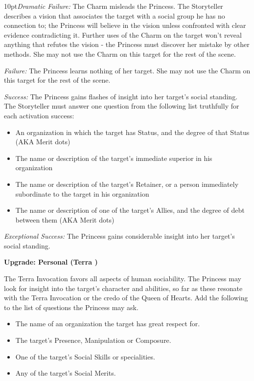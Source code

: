 \begin{myindentpar}{10pt}\emph{Dramatic Failure:} The Charm misleads the Princess. The Storyteller describes a vision that associates the target with a social group he has no connection to; the Princess will believe in the vision unless confronted with clear evidence contradicting it. Further uses of the Charm on the target won't reveal anything that refutes the vision - the Princess must discover her mistake by other methods. She may not use the Charm on this target for the rest of the scene.

\emph{Failure:} The Princess learns nothing of her target. She may not use the Charm on this target for the rest of the scene.

\emph{Success:} The Princess gains flashes of insight into her target's social standing. The Storyteller must answer one question from the following list truthfully for each activation success:

\begin{itemize}
\item An organization in which the target has Status, and the degree of that Status (AKA Merit dots)
\item The name or description of the target's immediate superior in his organization
\item The name or description of the target's Retainer, or a person immediately subordinate to the target in his organization
\item The name or description of one of the target's Allies, and the degree of debt between them (AKA Merit dots)
\end{itemize}


\emph{Exceptional Success:} The Princess gains considerable insight into her target's social standing.

\textbf{Upgrade: Personal (Terra \textbullet\textbullet)}

The Terra Invocation favors all aspects of human sociability. The Princess may look for insight into the target's character and abilities, so far as these resonate with the Terra Invocation or the credo of the Queen of Hearts. Add the following to the list of questions the Princess may ask.
\begin{itemize}
\item The name of an organization the target has great respect for. 
\item The target's Presence, Manipulation or Composure.
\item One of the target's Social Skills or specialities.
\item Any of the target's Social Merits.\end{itemize}\end{myindentpar}

